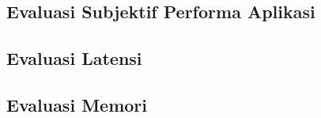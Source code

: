 \chapter{\babLima}
\label{bab:5}

\section{Evaluasi Subjektif Performa Aplikasi}

\section{Evaluasi Latensi}

\section{Evaluasi Memori}